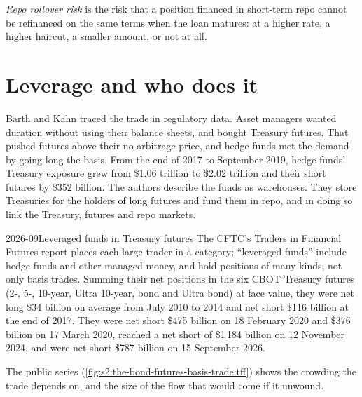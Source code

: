 \begin{definition}\label{def:s2:the-bond-futures-basis-trade:rollover}
\emph{Repo rollover risk} is the risk that a position financed in short-term repo cannot be refinanced on the same terms
when the loan matures: at a higher rate, a higher haircut, a smaller amount, or not at all.
\end{definition}

\section{Leverage and who does it}

Barth and Kahn traced the trade in regulatory data. Asset managers wanted duration without using their balance sheets, and bought Treasury futures.
That pushed futures above their no-arbitrage price, and hedge funds met the demand by going long the basis. From the end of 2017 to September 2019,
hedge funds' Treasury exposure grew from \$1.06 trillion to \$2.02 trillion and their short futures by \$352 billion. The authors describe the funds as
warehouses. They store Treasuries for the holders of long futures and fund them in repo, and in doing so link the Treasury, futures and repo markets.

\begin{dated}{2026-09}{Leveraged funds in Treasury futures}\label{dat:s2:the-bond-futures-basis-trade:tff}
The CFTC's Traders in Financial Futures report places each large trader in a category; ``leveraged funds'' include hedge funds and other managed
money, and hold positions of many kinds, not only basis trades. Summing their net positions in the six CBOT Treasury futures (2-, 5-, 10-year, Ultra
10-year, bond and Ultra bond) at face value, they were net long \$34 billion on average from July 2010 to 2014 and net short \$116 billion at the end of
2017. They were net short \$475 billion on 18 February 2020 and \$376 billion on 17 March 2020, reached a net short of \$1\,184 billion on 12 November
2024, and were net short \$787 billion on 15 September 2026.
\end{dated}

The public series (\cref{fig:s2:the-bond-futures-basis-trade:tff}) shows the crowding the trade depends on, and the size of the flow that would come if
it unwound.

